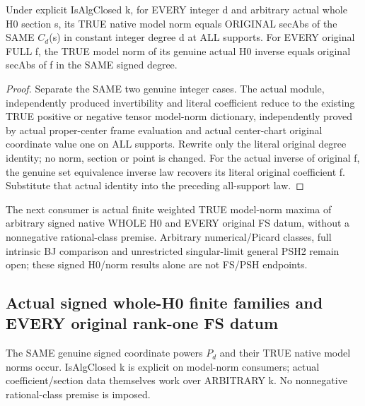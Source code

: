 \begin{theorem}
\label{thm:seven-native-signed-coordinate-model-norms}
\leanok
Under explicit IsAlgClosed k, for EVERY integer d and arbitrary actual
whole H0 section s, its TRUE native model norm equals ORIGINAL secAbs
of the SAME $C_d$(s) in constant integer degree d at ALL supports. For
EVERY original FULL f, the TRUE model norm of its genuine actual H0
inverse equals original secAbs of f in the SAME signed degree.
\end{theorem}
\begin{proof}
Separate the SAME two genuine integer cases. The actual module,
independently produced invertibility and literal coefficient reduce
to the existing TRUE positive or negative tensor model-norm dictionary,
independently proved by actual proper-center frame evaluation and actual
center-chart original coordinate value one on ALL supports. Rewrite
only the literal original degree identity; no norm, section or point
is changed. For the actual inverse of original f, the genuine set
equivalence inverse law recovers its literal original coefficient f.
Substitute that actual identity into the preceding all-support law.
\end{proof}

The next consumer is actual finite weighted TRUE model-norm maxima of
arbitrary signed native WHOLE H0 and EVERY original FS datum, without
a nonnegative rational-class premise. Arbitrary numerical/Picard classes,
full intrinsic BJ comparison and unrestricted singular-limit general
PSH2 remain open; these signed H0/norm results alone are not FS/PSH endpoints.

\subsection{Actual signed whole-H0 finite families and EVERY original rank-one FS datum}
The SAME genuine signed coordinate powers $P_d$ and their TRUE native
model norms occur. IsAlgClosed k is explicit on model-norm consumers;
actual coefficient/section data themselves work over ARBITRARY k.
No nonnegative rational-class premise is imposed.

